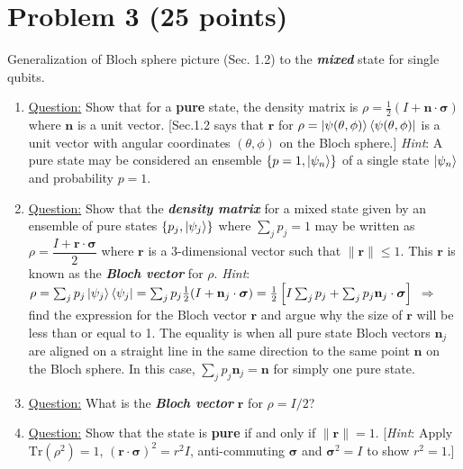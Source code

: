 \documentclass[11pt]{article}
\begin{document}
\section*{Problem 3 (25 points)}
Generalization of Bloch sphere picture (Sec. 1.2) to the \textbf{\textit{mixed}} state for single qubits.
\begin{enumerate}
    \item \underline{Question:} Show that for a \textbf{pure} state, the density matrix is $\rho = \frac{1}{2}(I + \mathbf{n} \cdot \boldsymbol{\sigma})$ where $\mathbf{n}$ is a unit vector. [Sec.1.2 says that $\mathbf{r}$ for $\rho = \ket{\psi(\theta,\phi)}\bra{\psi(\theta,\phi)}$ is a unit vector with angular coordinates $(\theta, \phi)$ on the Bloch sphere.] \textit{Hint}: A pure state may be considered an ensemble $\{p=1, \ket{\psi_n}\}$ of a single state $\ket{\psi_n}$ and probability $p=1$.
    \item \underline{Question:} Show that the \textbf{\textit{density matrix}} for a mixed state given by an ensemble of pure states $\{p_j, \ket{\psi_j}\}$ where $\sum_j p_j = 1$ may be written as $\rho = \dfrac{I + \mathbf{r} \cdot \boldsymbol{\sigma}}{2}$ where $\mathbf{r}$ is a 3-dimensional vector such that $\|\mathbf{r}\| \leq 1$. This $\mathbf{r}$ is known as the \textbf{\textit{Bloch vector}} for $\rho$. \textit{Hint}: $\rho = \sum_j p_j \ket{\psi_j}\bra{\psi_j} = \sum_j p_j \frac{1}{2}(I + \mathbf{n}_j \cdot \boldsymbol{\sigma}) = \frac{1}{2}\left[I\sum_j p_j + \sum_j p_j \mathbf{n}_j \cdot \boldsymbol{\sigma}\right]$ $\Rightarrow$ find the expression for the Bloch vector $\mathbf{r}$ and argue why the size of $\mathbf{r}$ will be less than or equal to 1. The equality is when all pure state Bloch vectors $\mathbf{n}_j$ are aligned on a straight line in the same direction to the same point $\mathbf{n}$ on the Bloch sphere. In this case, $\sum_j p_j \mathbf{n}_j = \mathbf{n}$ for simply one pure state.
    \item \underline{Question:} What is the \textbf{\textit{Bloch vector}} $\mathbf{r}$ for $\rho = I/2$?
    \item \underline{Question:} Show that the state is \textbf{pure} if and only if $\|\mathbf{r}\| = 1$. [\textit{Hint}: Apply $\text{Tr}(\rho^2) = 1$, $(\mathbf{r} \cdot \boldsymbol{\sigma})^2 = r^2 I$, anti-commuting $\boldsymbol{\sigma}$ and $\boldsymbol{\sigma}^2 = I$ to show $r^2 = 1$.]
\end{enumerate}
\end{document}
